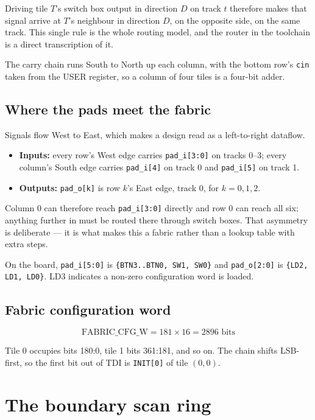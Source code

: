\documentclass[11pt,a4paper]{article}
\newcommand{\sig}[1]{\texttt{#1}}
\begin{document}
Driving tile $T$'s switch box output in direction $D$ on track $t$ therefore
makes that signal arrive at $T$'s neighbour in direction $D$, on the opposite
side, on the same track. This single rule is the whole routing model, and the
router in the toolchain is a direct transcription of it.

The carry chain runs South to North up each column, with the bottom row's
\sig{cin} taken from the USER register, so a column of four tiles is a four-bit
adder.

\subsection{Where the pads meet the fabric}

Signals flow West to East, which makes a design read as a left-to-right
dataflow.

\begin{itemize}[nosep]
  \item \textbf{Inputs:} every row's West edge carries \texttt{pad\_i[3:0]} on
        tracks 0--3; every column's South edge carries \texttt{pad\_i[4]} on
        track 0 and \texttt{pad\_i[5]} on track 1.
  \item \textbf{Outputs:} \texttt{pad\_o[k]} is row $k$'s East edge, track 0,
        for $k = 0,1,2$.
\end{itemize}

Column 0 can therefore reach \texttt{pad\_i[3:0]} directly and row 0 can reach
all six; anything further in must be routed there through switch boxes. That
asymmetry is deliberate --- it is what makes this a fabric rather than a lookup
table with extra steps.

On the board, \texttt{pad\_i[5:0]} is \texttt{\{BTN3..BTN0, SW1, SW0\}} and
\texttt{pad\_o[2:0]} is \texttt{\{LD2, LD1, LD0\}}. LD3 indicates a non-zero
configuration word is loaded.

\subsection{Fabric configuration word}

\[
\text{FABRIC\_CFG\_W} = 181 \times 16 = 2896 \text{ bits}
\]

Tile 0 occupies bits 180:0, tile 1 bits 361:181, and so on. The chain shifts
LSB-first, so the first bit out of TDI is \texttt{INIT[0]} of tile $(0,0)$.

\section{The boundary scan ring}
\end{document}
